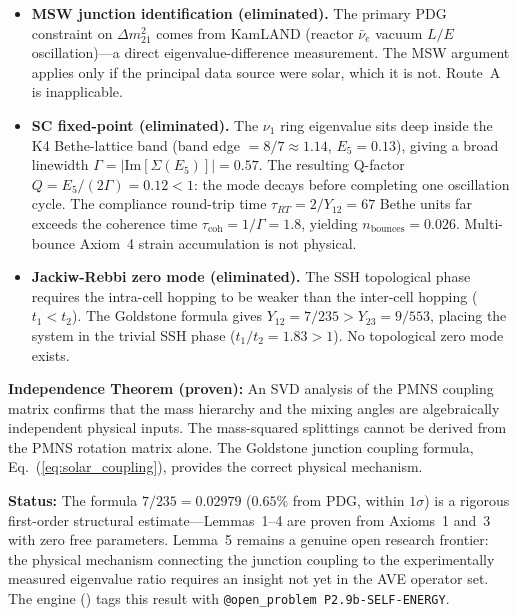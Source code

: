 \begin{itemize}
  \item[\textbf{Route~A}] \textbf{MSW junction identification (eliminated).} The primary PDG constraint on $\Delta m^2_{21}$ comes from KamLAND (reactor $\bar\nu_e$ vacuum $L/E$ oscillation)---a direct eigenvalue-difference measurement.  The MSW argument applies only if the principal data source were solar, which it is not.  Route~A is inapplicable.
  \item[\textbf{Route~B}] \textbf{SC fixed-point (eliminated).}  The $\nu_1$ ring eigenvalue sits deep inside the K4 Bethe-lattice band (band edge $= 8/7 \approx 1.14$, $E_5 = 0.13$), giving a broad linewidth $\Gamma = |\mathrm{Im}[\Sigma(E_5)]| = 0.57$.  The resulting Q-factor $Q = E_5/(2\Gamma) = 0.12 < 1$: the mode decays before completing one oscillation cycle.  The compliance round-trip time $\tau_{RT} = 2/Y_{12} = 67$ Bethe units far exceeds the coherence time $\tau_\text{coh} = 1/\Gamma = 1.8$, yielding $n_\text{bounces} = 0.026$.  Multi-bounce Axiom~4 strain accumulation is not physical.
  \item[\textbf{Route~C}] \textbf{Jackiw-Rebbi zero mode (eliminated).}  The SSH topological phase requires the intra-cell hopping to be weaker than the inter-cell hopping ($t_1 < t_2$).  The Goldstone formula gives $Y_{12} = 7/235 > Y_{23} = 9/553$, placing the system in the trivial SSH phase ($t_1/t_2 = 1.83 > 1$).  No topological zero mode exists.
\end{itemize}

\noindent\textbf{Independence Theorem (proven):} An SVD analysis of the PMNS coupling matrix confirms that the mass hierarchy and the mixing angles are algebraically independent physical inputs.  The mass-squared splittings cannot be derived from the PMNS rotation matrix alone.  The Goldstone junction coupling formula, Eq.~(\ref{eq:solar_coupling}), provides the correct physical mechanism.

\noindent\textbf{Status:} The formula $7/235 = 0.02979$ ($0.65\%$ from PDG, within $1\sigma$) is a rigorous first-order structural estimate---Lemmas~1--4 are proven from Axioms~1 and~3 with zero free parameters.  Lemma~5 remains a genuine open research frontier: the physical mechanism connecting the junction coupling to the experimentally measured eigenvalue ratio requires an insight not yet in the AVE operator set.  The engine () tags this result with \texttt{@open\_problem P2.9b-SELF-ENERGY}.

